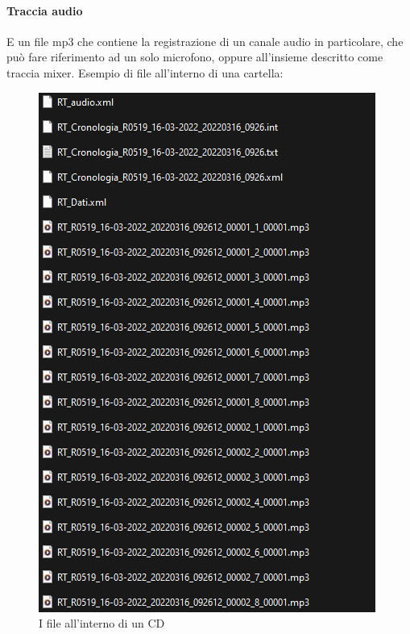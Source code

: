 \paragraph{Traccia audio}
E un file mp3 che contiene la registrazione di un canale audio in particolare, che può fare riferimento ad un solo microfono, oppure all'insieme descritto come traccia mixer.
Esempio di file all'interno di una cartella:
\begin{figure}[H]
  \centering
  \includegraphics[width=\textwidth]{immagini/CD-files.png}
  \caption{I file all'interno di un CD}
\end{figure}

